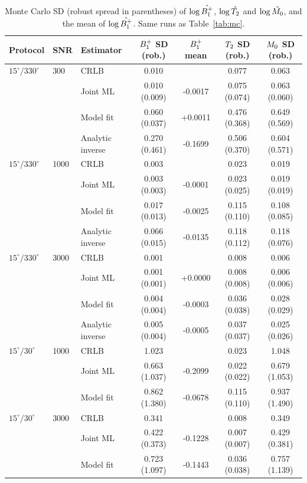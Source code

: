 \begin{table}[p]
\centering
\caption{Monte Carlo SD (robust spread in parentheses) of $\log\hat{B_1^{+}}$, $\log\hat{T_2}$ and $\log\hat{M_0}$, and the mean of $\log\hat{B_1^{+}}$. Same runs as Table~\ref{tab:mc}.}
\label{tab:mcb1}
\footnotesize
\begin{tabular}{lllcccc}
\toprule
Protocol & SNR & Estimator & $B_1^{+}$ SD (rob.) & $B_1^{+}$ mean & $T_2$ SD (rob.) & $M_0$ SD (rob.)\\
\midrule
$15^\circ/330^\circ$ & 300 & CRLB & 0.010 & & 0.077 & 0.063\\
 & & Joint ML & 0.010 (0.009) & -0.0017 & 0.075 (0.074) & 0.063 (0.060)\\
 & & Model fit & 0.060 (0.037) & +0.0011 & 0.476 (0.368) & 0.649 (0.569)\\
 & & Analytic inverse & 0.270 (0.461) & -0.1699 & 0.506 (0.370) & 0.604 (0.571)\\
\midrule
$15^\circ/330^\circ$ & 1000 & CRLB & 0.003 & & 0.023 & 0.019\\
 & & Joint ML & 0.003 (0.003) & -0.0001 & 0.023 (0.025) & 0.019 (0.019)\\
 & & Model fit & 0.017 (0.013) & -0.0025 & 0.115 (0.110) & 0.108 (0.085)\\
 & & Analytic inverse & 0.066 (0.015) & -0.0135 & 0.118 (0.112) & 0.118 (0.076)\\
\midrule
$15^\circ/330^\circ$ & 3000 & CRLB & 0.001 & & 0.008 & 0.006\\
 & & Joint ML & 0.001 (0.001) & +0.0000 & 0.008 (0.008) & 0.006 (0.006)\\
 & & Model fit & 0.004 (0.004) & -0.0003 & 0.036 (0.038) & 0.028 (0.029)\\
 & & Analytic inverse & 0.005 (0.004) & -0.0005 & 0.037 (0.037) & 0.025 (0.026)\\
\midrule
$15^\circ/30^\circ$ & 1000 & CRLB & 1.023 & & 0.023 & 1.048\\
 & & Joint ML & 0.663 (1.037) & -0.2099 & 0.022 (0.022) & 0.679 (1.053)\\
 & & Model fit & 0.862 (1.380) & -0.0678 & 0.115 (0.110) & 0.937 (1.490)\\
\midrule
$15^\circ/30^\circ$ & 3000 & CRLB & 0.341 & & 0.008 & 0.349\\
 & & Joint ML & 0.422 (0.373) & -0.1228 & 0.007 (0.007) & 0.429 (0.381)\\
 & & Model fit & 0.723 (1.097) & -0.1443 & 0.036 (0.038) & 0.757 (1.139)\\
\bottomrule
\end{tabular}
\end{table}

